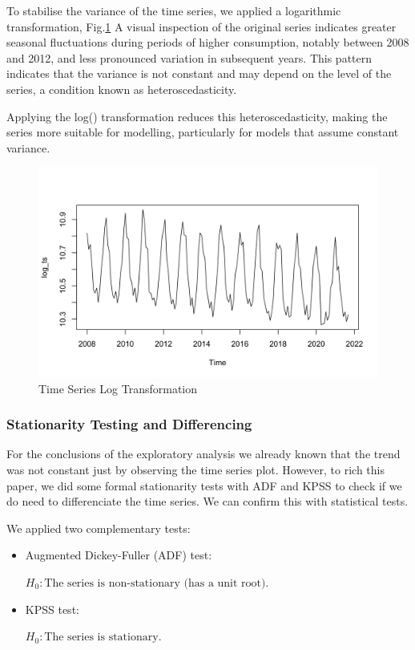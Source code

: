 To stabilise the variance of the time series, we applied a logarithmic transformation, Fig.\ref{fig:log}
A visual inspection of the original series indicates greater seasonal fluctuations during periods of higher consumption, notably between 2008 and 2012, and less pronounced variation in subsequent years.
This pattern indicates that the variance is not constant and may depend on the level of the series, a condition known as heteroscedasticity.

Applying the log() transformation reduces this heteroscedasticity, making the series more suitable for modelling, particularly for models that assume constant variance.

\begin{figure}[H]
    \centering
    \includegraphics[width=0.9\linewidth]{images/log.png}
    \caption{Time Series Log Transformation}
    \label{fig:log}
\end{figure}


\subsubsection{Stationarity Testing and Differencing}

\vspace{0.5\baselineskip}

For the conclusions of the exploratory analysis we already known that the trend was not constant just by observing the time series plot. However, to rich this paper, we did some formal stationarity tests with ADF and KPSS to check if we do need to differenciate the time series. We can confirm this with statistical tests.

We applied two complementary tests:
\begin{itemize}
    \item Augmented Dickey-Fuller (ADF) test:
    \begin{center}
        \( H_0: \text{The series is non-stationary (has a unit root).} \)
    \end{center}
    \item KPSS test:
    \begin{center}
        \( H_0: \text{The series is stationary.} \)
    \end{center}
\end{itemize}

